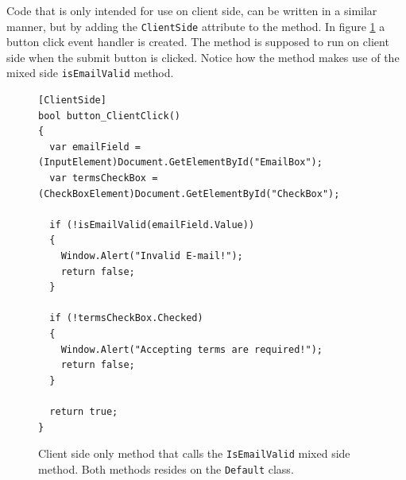 Code that is only intended for use on client side, can be written in a similar manner, but by adding the \texttt{ClientSide} attribute to the method. In figure \ref{fig:write_mics_code_clienside} a button click event handler is created. The method is supposed to run on client side when the submit button is clicked. Notice how the method makes use of the mixed side \texttt{isEmailValid} method.


\begin{figure}[H]
\begin{lstlisting}[language=CSharp,classoffset=1,morekeywords={Default,MiCSPage,Button,CheckBox,TextBox,EventArgs,ClientSide,InputElement,Document,CheckBoxElement,Window,MixedSide,Regex}]
[ClientSide]
bool button_ClientClick()
{
  var emailField = (InputElement)Document.GetElementById("EmailBox");
  var termsCheckBox = (CheckBoxElement)Document.GetElementById("CheckBox");
  
  if (!isEmailValid(emailField.Value))
  {
    Window.Alert("Invalid E-mail!");
    return false;
  }
  
  if (!termsCheckBox.Checked)
  {
    Window.Alert("Accepting terms are required!");
    return false;
  }
  
  return true;
}
\end{lstlisting}
\caption{Client side only method that calls the \texttt{IsEmailValid} mixed side method. Both methods resides on the \texttt{Default} class.}
\label{fig:write_mics_code_clienside}
\end{figure}

